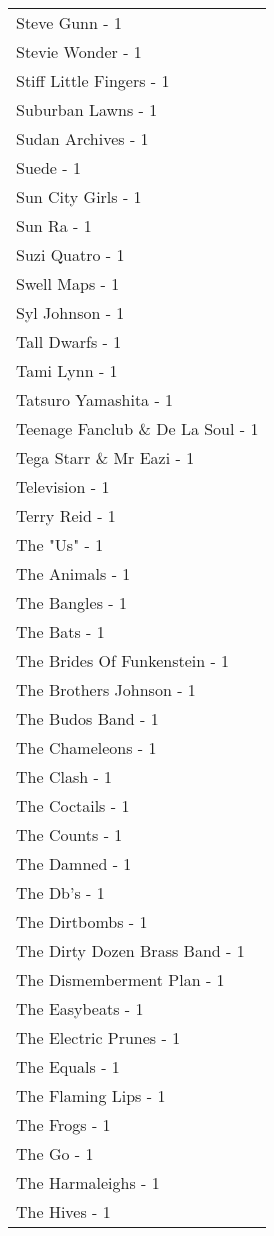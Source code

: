 \documentclass[
]{article}
\begin{document}
\begin{longtable}{l}
Steve Gunn - 1 \\ 
Stevie Wonder - 1 \\ 
Stiff Little Fingers - 1 \\ 
Suburban Lawns - 1 \\ 
Sudan Archives - 1 \\ 
Suede - 1 \\ 
Sun City Girls - 1 \\ 
Sun Ra - 1 \\ 
Suzi Quatro - 1 \\ 
Swell Maps - 1 \\ 
Syl Johnson - 1 \\ 
Tall Dwarfs - 1 \\ 
Tami Lynn - 1 \\ 
Tatsuro Yamashita - 1 \\ 
Teenage Fanclub \& De La Soul - 1 \\ 
Tega Starr \& Mr Eazi - 1 \\ 
Television - 1 \\ 
Terry Reid - 1 \\ 
The "Us" - 1 \\ 
The Animals - 1 \\ 
The Bangles - 1 \\ 
The Bats - 1 \\ 
The Brides Of Funkenstein - 1 \\ 
The Brothers Johnson - 1 \\ 
The Budos Band - 1 \\ 
The Chameleons - 1 \\ 
The Clash - 1 \\ 
The Coctails - 1 \\ 
The Counts - 1 \\ 
The Damned - 1 \\ 
The Db's - 1 \\ 
The Dirtbombs - 1 \\ 
The Dirty Dozen Brass Band - 1 \\ 
The Dismemberment Plan - 1 \\ 
The Easybeats - 1 \\ 
The Electric Prunes - 1 \\ 
The Equals - 1 \\ 
The Flaming Lips - 1 \\ 
The Frogs - 1 \\ 
The Go - 1 \\ 
The Harmaleighs - 1 \\ 
The Hives - 1 \\ 

\end{longtable}
\end{document}
